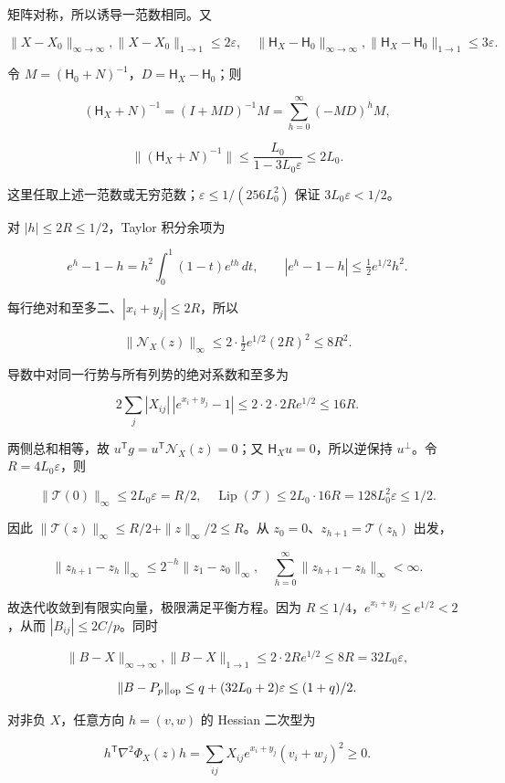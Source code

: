 \documentclass[11pt,a4paper]{article}
\begin{document}
矩阵对称，所以诱导一范数相同。又

\[
\|X-X_0\|_{\infty\to\infty},\|X-X_0\|_{1\to1}\le2\varepsilon,
\quad\|\mathsf H_X-\mathsf H_0\|_{\infty\to\infty},
\|\mathsf H_X-\mathsf H_0\|_{1\to1}\le3\varepsilon.
\]

令 \(M=(\mathsf H_0+N)^{-1}\)，\(D=\mathsf H_X-\mathsf H_0\)；则

\[
(\mathsf H_X+N)^{-1}=(I+MD)^{-1}M
=\sum_{h=0}^{\infty}(-MD)^hM,
\]

\[
\|(\mathsf H_X+N)^{-1}\|\le\frac{L_0}{1-3L_0\varepsilon}\le2L_0.
\]

这里任取上述一范数或无穷范数；\(\varepsilon\le1/(256L_0^2)\) 保证 \(3L_0\varepsilon<1/2\)。

对 \(|h|\le2R\le1/2\)，Taylor 积分余项为

\[
e^h-1-h=h^2\int_0^1(1-t)e^{th}\,dt,
\qquad |e^h-1-h|\le\tfrac12e^{1/2}h^2.
\]

每行绝对和至多二、\(|x_i+y_j|\le2R\)，所以

\[
\|\mathcal N_X(z)\|_\infty\le2\cdot\tfrac12e^{1/2}(2R)^2\le8R^2.
\]

导数中对同一行势与所有列势的绝对系数和至多为

\[
2\sum_j|X_{ij}|\,|e^{x_i+y_j}-1|
\le2\cdot2\cdot2Re^{1/2}\le16R.
\]

两侧总和相等，故 \(u^{\mathsf T}g=u^{\mathsf T}\mathcal N_X(z)=0\)；又 \(\mathsf H_Xu=0\)，所以逆保持 \(u^\perp\)。令 \(R=4L_0\varepsilon\)，则

\[
\|\mathcal T(0)\|_\infty\le2L_0\varepsilon=R/2,
\quad\operatorname{Lip}(\mathcal T)\le2L_0\cdot16R
=128L_0^2\varepsilon\le1/2.
\]

因此 \(\|\mathcal T(z)\|_\infty\le R/2+\|z\|_\infty/2\le R\)。从 \(z_0=0\)、\(z_{h+1}=\mathcal T(z_h)\) 出发，

\[
\|z_{h+1}-z_h\|_\infty\le2^{-h}\|z_1-z_0\|_\infty,
\quad\sum_{h=0}^{\infty}\|z_{h+1}-z_h\|_\infty<\infty.
\]

故迭代收敛到有限实向量，极限满足平衡方程。因为 \(R\le1/4\)，\(e^{x_i+y_j}\le e^{1/2}<2\)，从而 \(|B_{ij}|\le2C/p\)。同时

\[
\|B-X\|_{\infty\to\infty},\|B-X\|_{1\to1}
\le2\cdot2Re^{1/2}\le8R=32L_0\varepsilon,
\]

\[
\|B-P_p\|_{\rm op}\le q+(32L_0+2)\varepsilon\le(1+q)/2.
\]

对非负 \(X\)，任意方向 \(h=(v,w)\) 的 Hessian 二次型为

\[
h^{\mathsf T}\nabla^2\Phi_X(z)h
=\sum_{ij}X_{ij}e^{x_i+y_j}(v_i+w_j)^2\ge0.
\]
\end{document}
